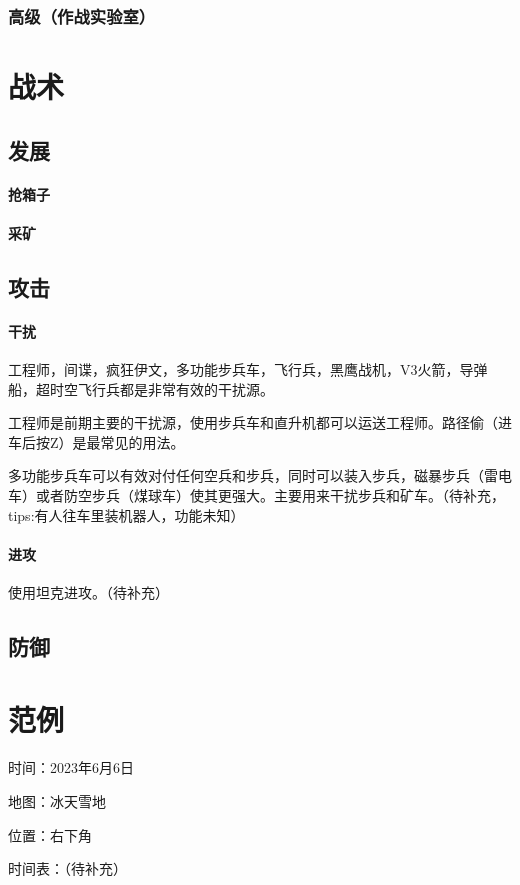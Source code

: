 \documentclass[12pt]{ctexart}
\begin{document}
			\subsubsection{高级（作战实验室）}
	\newpage
	
	\section{战术}
		\subsection{发展}
			\paragraph{抢箱子}
			\paragraph{采矿}
		\subsection{攻击}
			\paragraph{干扰}
			工程师，间谍，疯狂伊文，多功能步兵车，飞行兵，黑鹰战机，V3火箭，导弹船，超时空飞行兵都是非常有效的干扰源。
			
			工程师是前期主要的干扰源，使用步兵车和直升机都可以运送工程师。路径偷（进车后按Z）是最常见的用法。
			
			多功能步兵车可以有效对付任何空兵和步兵，同时可以装入步兵，磁暴步兵（雷电车）或者防空步兵（煤球车）使其更强大。主要用来干扰步兵和矿车。（待补充，tips:有人往车里装机器人，功能未知）
			\paragraph{进攻}
			使用坦克进攻。（待补充）
		\subsection{防御}
	\newpage
	
	\section{范例}
		时间：2023年6月6日
	
		地图：冰天雪地
		
		位置：右下角
		
		时间表：（待补充）
\end{document}

